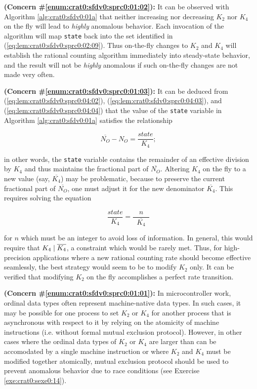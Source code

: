 \textbf{(Concern \#\ref{enum:crat0:sfdv0:sprc0:01:02}):}  It can be observed
with Algorithm \ref{alg:crat0:sfdv0:01a} that neither increasing
nor decreasing $K_2$ nor $K_4$ on the fly
will lead to \emph{highly} anomalous
behavior.  Each invocation of the algorithm will map 
\texttt{state} back into the set identified in
(\ref{eq:lem:crat0:sfdv0:sprc0:02:09}).  Thus on-the-fly changes
to $K_2$ and $K_4$ will establish the rational counting algorithm
immediately into steady-state behavior, and the result will not be
\emph{highly} anomalous if such on-the-fly changes are not
made very often.

\textbf{(Concern \#\ref{enum:crat0:sfdv0:sprc0:01:03}):}  It can be deduced
from 
(\ref{eq:lem:crat0:sfdv0:sprc0:04:02}),
(\ref{eq:lem:crat0:sfdv0:sprc0:04:03}), and 
(\ref{eq:lem:crat0:sfdv0:sprc0:04:04}) that the value of the 
\texttt{state} variable in Algorithm \ref{alg:crat0:sfdv0:01a}
satisfies the relationship

\begin{equation}
\label{eq:crat0:sfdv0:sprc0:01}
\overline{N_O} - N_O = \frac{state}{K_4} ;
\end{equation}

\noindent{}in other words, the \texttt{state} variable
contains the remainder of an effective division by $K_4$
and thus maintains the fractional part of $\overline{N_O}$.
Altering $K_4$ on the fly to a new value
(say, $\overline{K_4}$) may be problematic, because
to preserve the current fractional part
of $\overline{N_O}$, one must adjust it for
the new denominator $\overline{K_4}$.  This requires
solving the equation

\begin{equation}
\label{eq:crat0:sfdv0:sprc0:02}
\frac{state}{K_4} = \frac{n}{\;\;\overline{K_4}\;\;}
\end{equation}

\noindent{}for $n$ which must be an integer to avoid
loss of information.  In general,
this would require that $K_4 \mid \overline{K_4}$,
a constraint which would be rarely met.  Thus, for high-precision
applications where a new rational counting rate should become effective
seamlessly, the best strategy would seem to be to modify $K_2$ only. 
It can be verified that modifying $K_2$ on the fly accomplishes
a perfect rate transition.

\textbf{(Concern \#\ref{enum:crat0:sfdv0:sprc0:01:01}):}  In microcontroller work,
ordinal data types often represent machine-native data types.  In such cases,
it may be possible for one process to set $K_2$ or $K_4$
for another process that is asynchronous with respect to it by relying
on the atomicity of machine instructions (i.e. without formal mutual
exclusion protocol).  However, in other cases where the ordinal data types
of $K_2$ or $K_4$ are larger than can be accomodated by 
a single machine instruction or where $K_2$ and $K_4$ must be modified
together atomically, mutual exclusion protocol should be used to 
prevent anomalous behavior due to race conditions (see 
Exercise \ref{exe:crat0:sexe0:14}).


